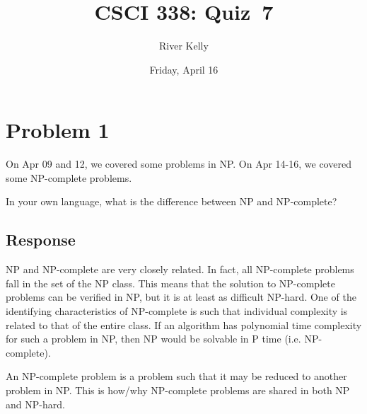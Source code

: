 \documentclass[11pt]{article}
\title{CSCI 338: Quiz~7}
\author{River Kelly}
\date{Friday, April 16}
\begin{document}
\maketitle

\newpage
\section*{Problem 1}

On Apr 09 and 12, we covered some problems in NP. On Apr 14-16, we covered
some NP-complete problems.

\noindent
In your own language, what is the difference between NP and NP-complete?

\subsection*{Response}

NP and NP-complete are very closely related. In fact, all NP-complete problems fall in the set of the NP class. This means that the solution to NP-complete problems can be verified in NP, but it is at least as difficult NP-hard. One of the identifying characteristics of NP-complete is such that individual complexity is related to that of the entire class. If an algorithm has polynomial time complexity for such a problem in NP, then NP would be solvable in P time (i.e. NP-complete).

\noindent
An NP-complete problem is a problem such that it may be reduced to another problem in NP. This is how/why NP-complete problems are shared in both NP and NP-hard.
\end{document}
